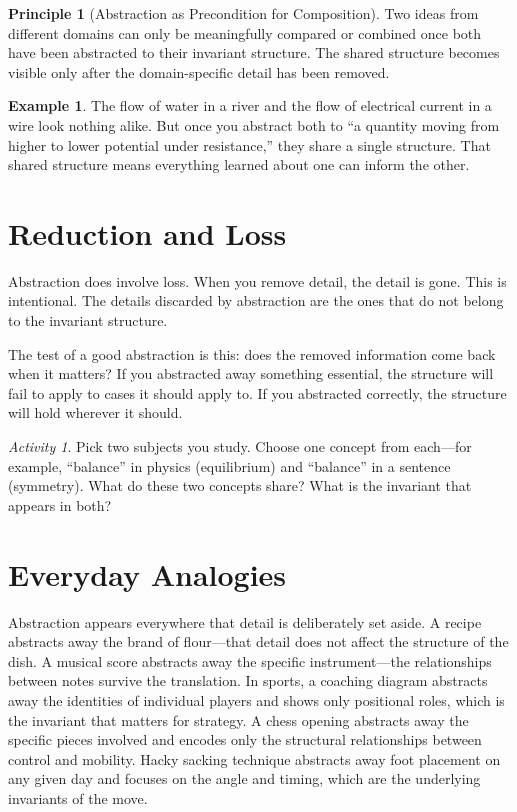 \documentclass[11pt]{book}
\theoremstyle{definition}
\newtheorem{example}[definition]{Example}
\newtheorem{principle}[definition]{Principle}
\theoremstyle{remark}
\newtheorem{activity}[definition]{Activity}
\begin{document}
\begin{principle}[Abstraction as Precondition for Composition]
Two ideas from different domains can only be meaningfully compared or
combined once both have been abstracted to their invariant structure.
The shared structure becomes visible only after the domain-specific detail
has been removed.
\end{principle}

\begin{example}
The flow of water in a river and the flow of electrical current in a wire
look nothing alike. But once you abstract both to ``a quantity moving from
higher to lower potential under resistance,'' they share a single structure.
That shared structure means everything learned about one can inform the other.
\end{example}

\section{Reduction and Loss}

Abstraction does involve loss. When you remove detail, the detail is gone.
This is intentional. The details discarded by abstraction are the ones that
do not belong to the invariant structure.

The test of a good abstraction is this: does the removed information come
back when it matters? If you abstracted away something essential, the
structure will fail to apply to cases it should apply to. If you abstracted
correctly, the structure will hold wherever it should.

\begin{activity}
Pick two subjects you study. Choose one concept from each---for example,
``balance'' in physics (equilibrium) and ``balance'' in a sentence
(symmetry). What do these two concepts share? What is the invariant
that appears in both?
\end{activity}

\section*{Everyday Analogies}

Abstraction appears everywhere that detail is deliberately set aside.
A recipe abstracts away the brand of flour---that detail does not affect
the structure of the dish. A musical score abstracts away the specific
instrument---the relationships between notes survive the translation.
In sports, a coaching diagram abstracts away the identities of individual
players and shows only positional roles, which is the invariant that
matters for strategy. A chess opening abstracts away the specific pieces
involved and encodes only the structural relationships between control and
mobility. Hacky sacking technique abstracts away foot placement on any
given day and focuses on the angle and timing, which are the underlying
invariants of the move.
\end{document}
